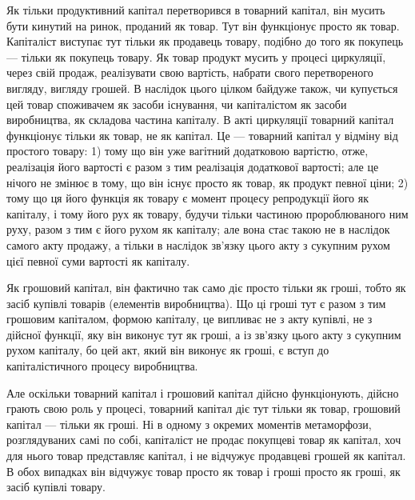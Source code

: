 Як тільки продуктивний капітал перетворився в товарний капітал,
він мусить бути кинутий на ринок, проданий як товар.
Тут він функціонує просто як товар. Капіталіст виступає тут
тільки як продавець товару, подібно до того як покупець —
тільки як покупець товару. Як товар продукт мусить у процесі
циркуляції, через свій продаж, реалізувати свою вартість, набрати
свого перетвореного вигляду, вигляду грошей. В наслідок
цього цілком байдуже також, чи купується цей товар споживачем
як засоби існування, чи капіталістом як засоби виробництва,
як складова частина капіталу. В акті циркуляції товарний
капітал функціонує тільки як товар, не як капітал. Це — товарний капітал у відміну від простого
товару: 1) тому що він
уже вагітний додатковою вартістю, отже, реалізація його вартості
є разом з тим реалізація додаткової вартості; але це нічого не
змінює в тому, що він існує просто як товар, як продукт певної
ціни; 2) тому що ця його функція як товару є момент процесу
репродукції його як капіталу, і тому його рух як товару,
будучи тільки частиною пророблюваного ним руху, разом з тим
є його рухом як капіталу; але вона стає такою не в наслідок
самого акту продажу, а тільки в наслідок зв’язку цього акту
з сукупним рухом цієї певної суми вартості як капіталу.

Як грошовий капітал, він фактично так само діє просто тільки
як гроші, тобто як засіб купівлі товарів (елементів виробництва).
Що ці гроші тут є разом з тим грошовим капіталом, формою капіталу,
це випливає не з акту купівлі, не з дійсної функції, яку
він виконує тут як гроші, а із зв’язку цього акту з сукупним
рухом капіталу, бо цей акт, який він виконує як гроші, є вступ
до капіталістичного процесу виробництва.

Але оскільки товарний капітал і грошовий капітал дійсно
функціонують, дійсно грають свою роль у процесі, товарний капітал
діє тут тільки як товар, грошовий капітал — тільки як гроші.
Ні в одному з окремих моментів метаморфози, розглядуваних самі
по собі, капіталіст не продає покупцеві товар як капітал, хоч
для нього товар представляє капітал, і не відчужує продавцеві
грошей як капітал. В обох випадках він відчужує товар
просто як товар і гроші просто як гроші, як засіб купівлі
товару.

